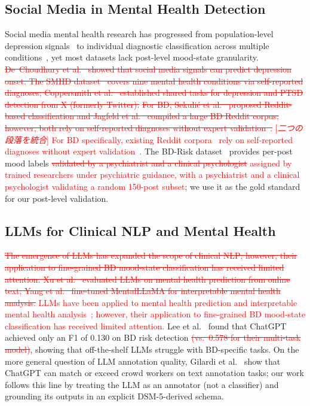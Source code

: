 \documentclass[runningheads]{llncs}
\newcommand{\rev}[1]{\textcolor{red}{#1}}
\newcommand{\del}[1]{\textcolor{red}{\sout{#1}}}
\newcommand{\dnote}[1]{\textcolor{red}{[\textit{#1}]}}
\newcommand{\rev}[1]{#1}
\newcommand{\del}[1]{}
\newcommand{\dnote}[1]{}
\begin{document}
\subsection{Social Media in Mental Health Detection}

Social media mental health research has progressed from population-level depression signals\rev{~\cite{dechoudhury2013predicting}} to individual diagnostic classification across multiple conditions\rev{~\cite{cohan2018smhd,coppersmith2015clpsych}}, yet most datasets lack post-level mood-state granularity. \del{De~Choudhury et al.~\cite{dechoudhury2013predicting} showed that social media signals can predict depression onset. The SMHD dataset~\cite{cohan2018smhd} covers nine mental health conditions via self-reported diagnoses; Coppersmith et al.~\cite{coppersmith2015clpsych} established shared tasks for depression and PTSD detection from X (formerly Twitter).} \del{For BD, Sekuli\'{c} et al.~\cite{sekulic2018not} proposed Reddit-based classification and Jagfeld et al.~\cite{jagfeld2021understanding} compiled a large BD Reddit corpus; however, both rely on self-reported diagnoses without expert validation~\cite{harrigian2021state,chancellor2020methods}.} \dnote{二つの段落を統合} \rev{For BD specifically, existing Reddit corpora~\cite{jagfeld2021understanding,sekulic2018not} rely on self-reported diagnoses without expert validation~\cite{harrigian2021state}.} The BD-Risk dataset~\cite{lee2024detecting} provides per-post mood labels \del{validated by a psychiatrist and a clinical psychologist} \rev{assigned by trained researchers under psychiatric guidance, with a psychiatrist and a clinical psychologist validating a random 150-post subset}; we use it as the gold standard for our post-level validation.

\subsection{LLMs for Clinical NLP and Mental Health}

\del{The emergence of LLMs has expanded the scope of clinical NLP; however, their application to fine-grained BD mood-state classification has received limited attention. Xu et al.~\cite{xu2024mental} evaluated LLMs on mental health prediction from online text; Yang et al.~\cite{yang2024mentallama} fine-tuned MentalLLaMA for interpretable mental health analysis.} \rev{LLMs have been applied to mental health prediction and interpretable mental health analysis~\cite{xu2024mental,yang2024mentallama}; however, their application to fine-grained BD mood-state classification has received limited attention.} Lee et al.~\cite{lee2024detecting} found that ChatGPT achieved only an F1 of 0.130 on BD risk detection\del{ (vs.~0.578 for their multi-task model)}, showing that off-the-shelf LLMs struggle with BD-specific tasks. On the more general question of LLM annotation quality, Gilardi et al.~\cite{gilardi2023chatgpt} show that ChatGPT can match or exceed crowd workers on text annotation tasks; our work follows this line by treating the LLM as an annotator (not a classifier) and grounding its outputs in an explicit DSM-5-derived schema.
\end{document}
